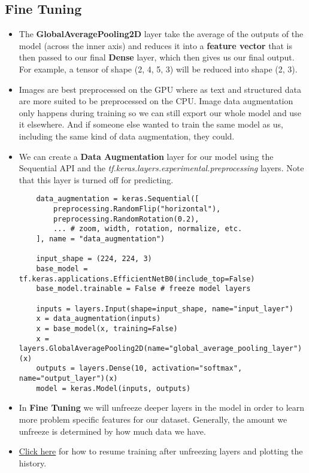 \documentclass[11pt, a4paper]{article}
\begin{document}
	\subsection{Fine Tuning}
	\begin{itemize}
		\item The \textbf{GlobalAveragePooling2D} layer take the average of the outputs of the model (across the inner axis) and reduces it into a \textbf{feature vector} that is then passed to our final \textbf{Dense} layer, which then gives us our final output. For example, a tensor of shape (2, 4, 5, 3) will be reduced into shape (2, 3).
		\item Images are best preprocessed on the GPU where as text and structured data are more suited to be preprocessed on the CPU. Image data augmentation only happens during training so we can still export our whole model and use it elsewhere. And if someone else wanted to train the same model as us, including the same kind of data augmentation, they could.
		\item We can create a \textbf{Data Augmentation} layer for our model using the Sequential API and the \textit{ tf.keras.layers.experimental.preprocessing} layers. Note that this layer is turned off for predicting.
	\begin{lstlisting}
	data_augmentation = keras.Sequential([
		preprocessing.RandomFlip("horizontal"),
		preprocessing.RandomRotation(0.2),
		... # zoom, width, rotation, normalize, etc.
	], name = "data_augmentation")
	
	input_shape = (224, 224, 3)
	base_model = tf.keras.applications.EfficientNetB0(include_top=False)
	base_model.trainable = False # freeze model layers
	
	inputs = layers.Input(shape=input_shape, name="input_layer")
	x = data_augmentation(inputs)
	x = base_model(x, training=False)
	x = layers.GlobalAveragePooling2D(name="global_average_pooling_layer")(x)
	outputs = layers.Dense(10, activation="softmax", name="output_layer")(x)
	model = keras.Model(inputs, outputs)	\end{lstlisting}
	\end{itemize} \newpage


	\begin{itemize}
		\item In \textbf{Fine Tuning} we will unfreeze deeper layers in the model in order to learn more problem specific features for our dataset. Generally, the amount we unfreeze is determined by how much data we have. 
		\item \href{https://github.com/mrdbourke/tensorflow-deep-learning/blob/main/05_transfer_learning_in_tensorflow_part_2_fine_tuning.ipynb}{Click here} for how to resume training after unfreezing layers and plotting the history.
	\end{itemize} \vspace*{2mm}
	
\end{document}
